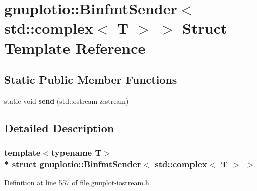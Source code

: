 \hypertarget{structgnuplotio_1_1_binfmt_sender_3_01std_1_1complex_3_01_t_01_4_01_4}{}\section{gnuplotio\+:\+:Binfmt\+Sender$<$ std\+:\+:complex$<$ T $>$ $>$ Struct Template Reference}
\label{structgnuplotio_1_1_binfmt_sender_3_01std_1_1complex_3_01_t_01_4_01_4}
\subsection*{Static Public Member Functions}
\begin{DoxyCompactItemize}
\item 
static void {\bfseries send} (std\+::ostream \&stream)\hypertarget{structgnuplotio_1_1_binfmt_sender_3_01std_1_1complex_3_01_t_01_4_01_4_a64633d068c93ef2822ee3aa6ef39d623}{}\label{structgnuplotio_1_1_binfmt_sender_3_01std_1_1complex_3_01_t_01_4_01_4_a64633d068c93ef2822ee3aa6ef39d623}

\end{DoxyCompactItemize}


\subsection{Detailed Description}
\subsubsection*{template$<$typename T$>$\\*
struct gnuplotio\+::\+Binfmt\+Sender$<$ std\+::complex$<$ T $>$ $>$}



Definition at line 557 of file gnuplot-\/iostream.\+h.

